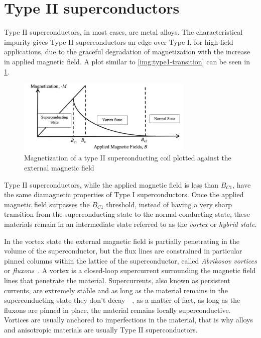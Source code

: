 \section{Type II superconductors}
\label{sec:type2}
Type II superconductors, in most cases, are metal alloys. The characteristical impurity gives Type II superconductors an edge
over Type I, for high-field applications, due to the graceful degradation of magnetization with the increase in applied magnetic
field. A plot similar to \cref{img:type1-transition} can be seen in \cref{img:type2-transition}.
\begin{figure}
	\centering
	\includegraphics[width=0.75\textwidth]{./img/type2.png}
	\caption{Magnetization of a type II superconducting coil plotted against the external
		magnetic field~\cite{slimani2022superconducting}}
	\label{img:type2-transition}
\end{figure}

\medskip

Type II superconductors, while the applied magnetic field is less than $B_{C1}$, have the same
diamagnetic properties of Type I superconductors. Once the applied magnetic field surpasses the
$B_{C1}$ threshold, instead of having a very sharp transition from the superconducting state to
the normal-conducting state, these materials remain in an intermediate state referred to as the \emph{vortex} or \emph{hybrid state}.

\medskip

In the vortex state the external magnetic field is partially penetrating in the volume of the superconductor, but the
flux lines are constrained in particular pinned columns within the lattice of the
superconductor, called \emph{Abrikosov vortices} or \emph{fluxons}~\cite{abrikosov-vortices}.
A vortex is a closed-loop supercurrent surrounding the magnetic field lines that
penetrate the material. Supercurrents, also known as persistent currents, are extremely stable and as long as the material remains in the
superconducting state they don't decay~\cite{fujita-theory-HTS}~\cite{file1963}, as a matter of fact, as long as the
fluxons are pinned in place, the material remains locally superconductive. Vortices are usually anchored to imperfections in the material, that is why alloys and anisotropic materials are usually Type II superconductors.

